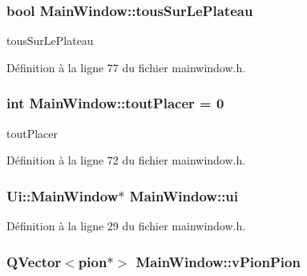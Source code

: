 \hypertarget{class_main_window_addef95af943f4874df6489bf08f2a516}{
\subsubsection[{tous\-Sur\-Le\-Plateau}]{\setlength{\rightskip}{0pt plus 5cm}bool Main\-Window\-::tous\-Sur\-Le\-Plateau}}\label{class_main_window_addef95af943f4874df6489bf08f2a516}


tous\-Sur\-Le\-Plateau 



Définition à la ligne 77 du fichier mainwindow.\-h.

\hypertarget{class_main_window_a3356efaa3ec31594ed925406751cb1ab}{
\subsubsection[{tout\-Placer}]{\setlength{\rightskip}{0pt plus 5cm}int Main\-Window\-::tout\-Placer = 0}}\label{class_main_window_a3356efaa3ec31594ed925406751cb1ab}


tout\-Placer 



Définition à la ligne 72 du fichier mainwindow.\-h.

\hypertarget{class_main_window_a35466a70ed47252a0191168126a352a5}{
\subsubsection[{ui}]{\setlength{\rightskip}{0pt plus 5cm}Ui\-::\-Main\-Window$\ast$ Main\-Window\-::ui}}\label{class_main_window_a35466a70ed47252a0191168126a352a5}


Définition à la ligne 29 du fichier mainwindow.\-h.

\hypertarget{class_main_window_a972ef4345f96449207b78b25c170e0ba}{
\subsubsection[{v\-Pion\-Pion}]{\setlength{\rightskip}{0pt plus 5cm}Q\-Vector$<${\bf pion}$\ast$$>$ Main\-Window\-::v\-Pion\-Pion}}\label{class_main_window_a972ef4345f96449207b78b25c170e0ba}


